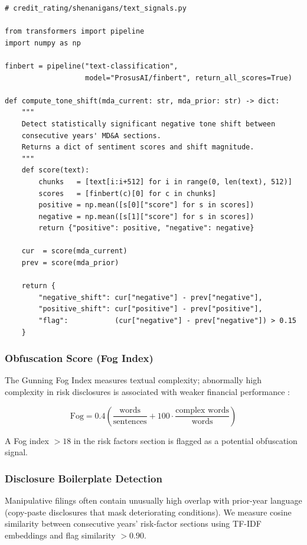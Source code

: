\documentclass[12pt, a4paper]{article}
\begin{document}
\begin{lstlisting}[caption={Sentiment tone analysis of MD\&A sections}, label=lst:sentiment]
# credit_rating/shenanigans/text_signals.py

from transformers import pipeline
import numpy as np

finbert = pipeline("text-classification",
                   model="ProsusAI/finbert", return_all_scores=True)

def compute_tone_shift(mda_current: str, mda_prior: str) -> dict:
    """
    Detect statistically significant negative tone shift between
    consecutive years' MD&A sections.
    Returns a dict of sentiment scores and shift magnitude.
    """
    def score(text):
        chunks   = [text[i:i+512] for i in range(0, len(text), 512)]
        scores   = [finbert(c)[0] for c in chunks]
        positive = np.mean([s[0]["score"] for s in scores])
        negative = np.mean([s[1]["score"] for s in scores])
        return {"positive": positive, "negative": negative}

    cur  = score(mda_current)
    prev = score(mda_prior)

    return {
        "negative_shift": cur["negative"] - prev["negative"],
        "positive_shift": cur["positive"] - prev["positive"],
        "flag":           (cur["negative"] - prev["negative"]) > 0.15
    }
\end{lstlisting}

\subsubsection{Obfuscation Score (Fog Index)}

The Gunning Fog Index measures textual complexity; abnormally high complexity in risk disclosures is associated with weaker financial performance \citep{li2008annual}:

\begin{equation}
  \text{Fog} = 0.4 \left(\frac{\text{words}}{\text{sentences}} + 100 \cdot \frac{\text{complex words}}{\text{words}}\right)
\end{equation}

A Fog index $>18$ in the risk factors section is flagged as a potential obfuscation signal.

\subsubsection{Disclosure Boilerplate Detection}

Manipulative filings often contain unusually high overlap with prior-year language (copy-paste disclosures that mask deteriorating conditions).  We measure cosine similarity between consecutive years' risk-factor sections using TF-IDF embeddings and flag similarity $> 0.90$.
\end{document}
